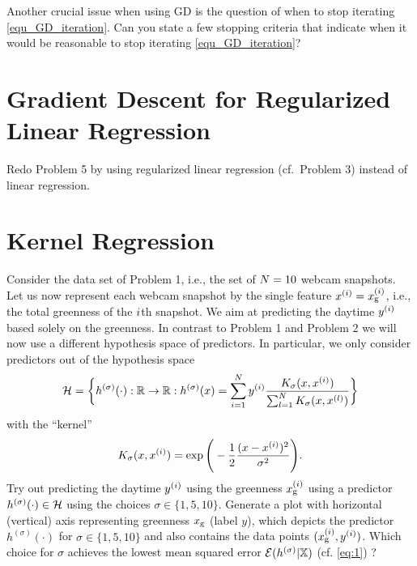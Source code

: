 \documentclass[article,11pt]{article}
\begin{document}
Another crucial issue when using GD is the question of when to stop iterating \eqref{equ_GD_iteration}. Can you 
state a few stopping criteria that indicate when it would be reasonable to stop iterating \eqref{equ_GD_iteration}?



\newpage
\section{Gradient Descent for Regularized Linear Regression}
Redo Problem 5 by using regularized linear regression (cf.\ Problem 3) instead of linear regression. 


\newpage
\section{Kernel Regression}
Consider the data set of Problem 1, i.e., the set of $N=10$ webcam snapshots. Let us now represent each webcam snapshot by 
the single feature $x^{(i)} = x_{\rm g}^{(i)}$, i.e., the total greenness of the $i$th snapshot. We aim 
at predicting the daytime $y^{(i)}$ based solely on the greenness. In contrast to Problem 1 and Problem 2 we will now 
use a different hypothesis space of predictors. In particular, we only consider predictors out of the hypothesis space
\begin{equation}
\mathcal{H} = \bigg\{h^{(\sigma)}(\cdot): \mathbb{R} \rightarrow \mathbb{R}: h^{(\sigma)} (x) = \sum_{i=1}^{N} y^{(i)} \frac{K_\sigma(x,x^{(i)})}{\sum_{l=1}^{N} K_\sigma (x,x^{(l)})} \bigg\}
\end{equation}
with the ``kernel''  
\begin{equation}
K_\sigma(x, x^{(i)}) = \exp \Bigg( -\frac{1}{2} \frac{(x-x^{(i)})^2 }{\sigma^2} \Bigg).
\end{equation}
Try out predicting the daytime $y^{(i)}$ using the greenness $x_{\rm g}^{(i)}$ using a predictor $h^{(\sigma)}(\cdot) \in \mathcal{H}$ using the 
choices $\sigma \in \{1,5,10\}$. Generate a plot with horizontal (vertical) axis representing greenness $x_{\rm g}$ (label $y$), which depicts the predictor 
$h^{(\sigma)}(\cdot)$ for $\sigma \in \{1,5,10\}$ and also contains the data points $(x_{\rm g}^{(i)},y^{(i)})$.
Which choice for $\sigma$ achieves the lowest mean squared error $\mathcal{E}(h^{(\sigma)}| \mathbb{X})$ (cf. \eqref{eq:1}) ?
\end{document}
